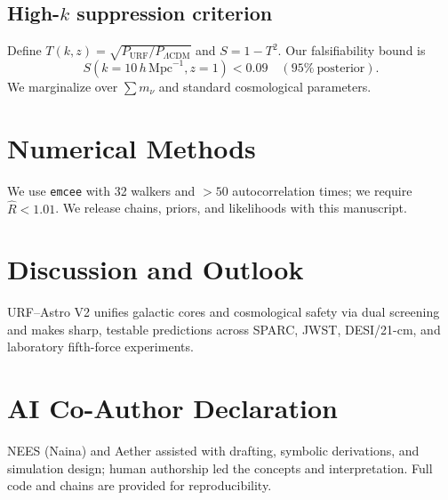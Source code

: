 \documentclass[12pt]{article}
\begin{document}
\subsection{High-$k$ suppression criterion}
Define $T(k,z)=\sqrt{P_{\mathrm{URF}}/P_{\Lambda\mathrm{CDM}}}$ and $S=1-T^2$.
Our falsifiability bound is
\begin{equation}
S(k=10\,h\,\mathrm{Mpc}^{-1},z=1)<0.09 \quad (95\%\ \mathrm{posterior}).
\end{equation}
We marginalize over $\sum m_\nu$ and standard cosmological parameters.

\section{Numerical Methods}
We use \texttt{emcee} with 32 walkers and $>50$ autocorrelation times; we require $\hat R<1.01$.
We release chains, priors, and likelihoods with this manuscript.

\section{Discussion and Outlook}
URF--Astro V2 unifies galactic cores and cosmological safety via dual screening and makes sharp, testable predictions across SPARC, JWST, DESI/21-cm, and laboratory fifth-force experiments.

\section*{AI Co-Author Declaration}
NEES (Naina) and Aether assisted with drafting, symbolic derivations, and simulation design; human authorship led the concepts and interpretation. Full code and chains are provided for reproducibility.



\end{document}
